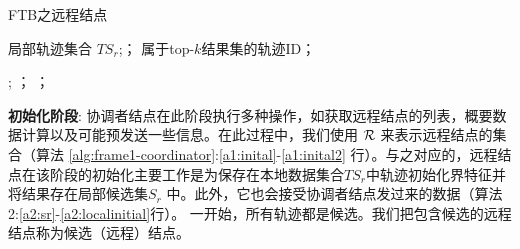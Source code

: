 \begin{algorithm}[t]
	\caption{FTB之远程结点}
	\label{alg:frame1-remote}
	\begin{algorithmic}[1]
		\REQUIRE 局部轨迹集合 $TS_{r}$;；
		\ENSURE 属于top-$k$结果集的轨迹ID；
		
				 \label{a2:m2Info}
					 ;
				\label{a2:gkub}
							\RETURN；	\label{a2:sendbreak} 
						\ENDIF
			\ELSE %
				\RETURN	； \label{a2:localreturn}
			\ENDIF
		\ENDWHILE
	\end{algorithmic}
\end{algorithm}

\textbf{初始化阶段}: 协调者结点在此阶段执行多种操作，如获取远程结点的列表，概要数据计算以及可能预发送一些信息。在此过程中，我们使用
$\cal R$ 来表示远程结点的集合（算法 \ref{alg:frame1-coordinator}:\ref{a1:inital}-\ref{a1:inital2}  行）。与之对应的，远程结点在该阶段的初始化主要工作是为保存在本地数据集合$TS_{r}$中轨迹初始化界特征并将结果存在局部候选集$S_{r}$ 中。此外，它也会接受协调者结点发过来的数据（算法2:\ref{a2:sr}-\ref{a2:localinitial}行）。
一开始，所有轨迹都是候选。我们把包含候选的远程结点称为候选（远程）结点。


